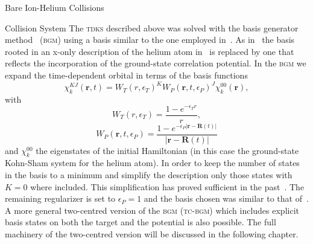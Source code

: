 \documentclass[letterpaper, 11 pt]{report}
\begin{document}
\begin{chapter}{Bare Ion-Helium Collisions \label{chap:p-he2p-he}}
\begin{section}{Collision System \label{sec:p-he2p-he-sys}}
      The \textsc{tdks} described above was solved with the basis generator method~\cite{bgm}
      (\textsc{bgm}) using a basis similar to the one employed in~\cite{keim-ihe}. As in~\cite{pbarhe}
      the basis rooted in an x-only description of the helium atom in~\cite{keim-ihe} is replaced by one
      that reflects the incorporation of the ground-state correlation potential. In the \textsc{bgm} we
      expand the time-dependent orbital in terms of the basis functions
      \begin{equation} \label{eq:bgmbasis}
         \chi^{KJ}_k (\mathbf{r},t)
         = W_T(r,\epsilon_T)^K W_P( \mathbf{r},t, \epsilon_P)^J \chi^{00}_k (\mathbf{r}),
      \end{equation}
      with
      \begin{equation}
         W_T(r,\epsilon_T) = \frac{1 - e^{-\epsilon_T r}}{r},
      \end{equation}
      \begin{equation}
         W_P (\mathbf{r},t,\epsilon_P)
         = \frac{1 - e^{-\epsilon_P|\mathbf{r} - \mathbf{R}(t)|}}{|\mathbf{r} - \mathbf{R}(t)|}
      \end{equation}
      and $\chi^{00}_k$ the eigenstates of the initial Hamiltonian (in this case the ground-state
      Kohn-Sham system for the helium atom). In order to keep the number of states in the basis to a
      minimum and simplify the description only those states with $K = 0$ where included. This
      simplification has proved sufficient in the past~\cite{bgm-rev}. The remaining regularizer is set
      to $\epsilon_P = 1$ and the basis chosen was similar to that of~\cite{keim-ihe}. A more general
      two-centred version of the \textsc{bgm} (\textsc{tc-bgm}) which includes explicit basis states on
      both the target and the potential is also possible. The full machinery of the two-centred version
      will be discussed in the following chapter.


\end{section}
\end{chapter}
\end{document}

